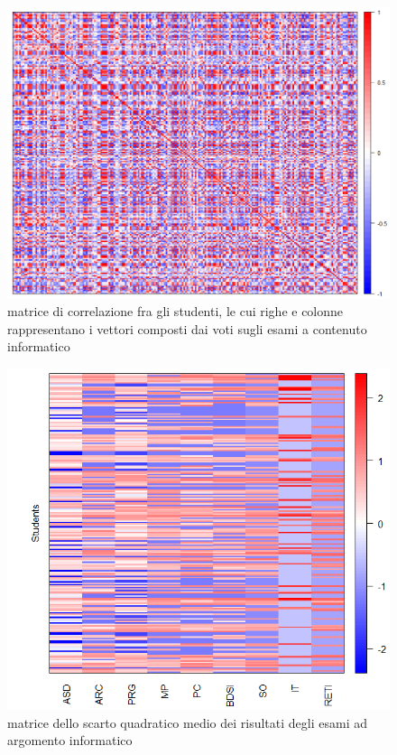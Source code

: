                 \begin{figure}
                    \centering
                    \caption{matrice di correlazione fra gli studenti, le cui righe e colonne rappresentano i vettori composti dai voti sugli esami a contenuto informatico}
                    \label{esami_inf_corr}
                	\includegraphics[scale=0.38]{img/corr_matrix_2.png}
                \end{figure}

                \begin{figure}
                    \centering
                    \caption{matrice dello scarto quadratico medio dei risultati degli esami ad argomento informatico}
                    \label{esami_inf_stddev}
                	\includegraphics[scale=0.75]{img/std_dev_matrix_2.png}
                \end{figure}

